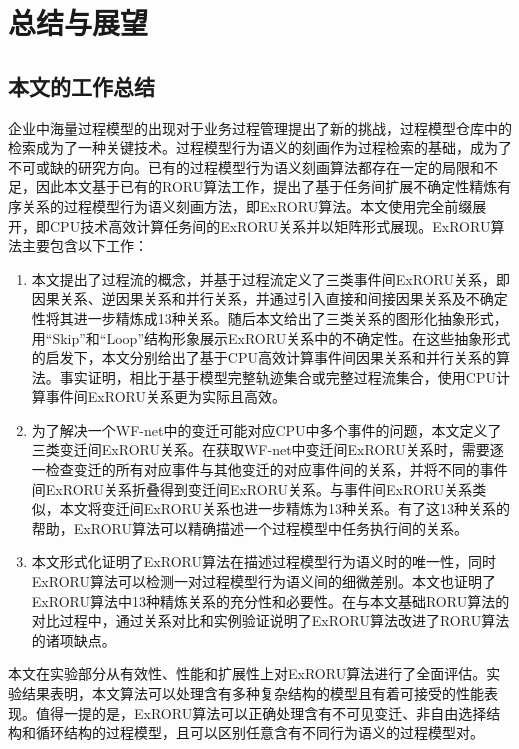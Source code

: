 \chapter{总结与展望}\label{cha:conclusion}

\section{本文的工作总结}\label{sec:conclusion}
企业中海量过程模型的出现对于业务过程管理提出了新的挑战，过程模型仓库中的检索成为了一种关键技术。过程模型行为语义的刻画作为过程检索的基础，成为了不可或缺的研究方向。已有的过程模型行为语义刻画算法都存在一定的局限和不足，因此本文基于已有的RORU算法工作，提出了基于任务间扩展不确定性精炼有序关系的过程模型行为语义刻画方法，即ExRORU算法。本文使用完全前缀展开，即CPU技术高效计算任务间的ExRORU关系并以矩阵形式展现。ExRORU算法主要包含以下工作：
\begin{enumerate}[1.]
  \item 本文提出了过程流的概念，并基于过程流定义了三类事件间ExRORU关系，即因果关系、逆因果关系和并行关系，并通过引入直接和间接因果关系及不确定性将其进一步精炼成13种关系。随后本文给出了三类关系的图形化抽象形式，用“Skip”和“Loop”结构形象展示ExRORU关系中的不确定性。在这些抽象形式的启发下，本文分别给出了基于CPU高效计算事件间因果关系和并行关系的算法。事实证明，相比于基于模型完整轨迹集合或完整过程流集合，使用CPU计算事件间ExRORU关系更为实际且高效。
  \item 为了解决一个WF-net中的变迁可能对应CPU中多个事件的问题，本文定义了三类变迁间ExRORU关系。在获取WF-net中变迁间ExRORU关系时，需要逐一检查变迁的所有对应事件与其他变迁的对应事件间的关系，并将不同的事件间ExRORU关系折叠得到变迁间ExRORU关系。与事件间ExRORU关系类似，本文将变迁间ExRORU关系也进一步精炼为13种关系。有了这13种关系的帮助，ExRORU算法可以精确描述一个过程模型中任务执行间的关系。
  \item 本文形式化证明了ExRORU算法在描述过程模型行为语义时的唯一性，同时ExRORU算法可以检测一对过程模型行为语义间的细微差别。本文也证明了ExRORU算法中13种精炼关系的充分性和必要性。在与本文基础RORU算法的对比过程中，通过关系对比和实例验证说明了ExRORU算法改进了RORU算法的诸项缺点。
\end{enumerate}

本文在实验部分从有效性、性能和扩展性上对ExRORU算法进行了全面评估。实验结果表明，本文算法可以处理含有多种复杂结构的模型且有着可接受的性能表现。值得一提的是，ExRORU算法可以正确处理含有不可见变迁、非自由选择结构和循环结构的过程模型，且可以区别任意含有不同行为语义的过程模型对。

